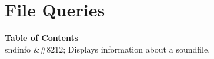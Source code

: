 \begin{comment}
\documentclass[10pt]{article}
\usepackage{fullpage, graphicx, url}
\setlength{\parskip}{1ex}
\setlength{\parindent}{0ex}
\title{File Queries}



\begin{tabular}{ccc}
The Alternative Csound Reference Manual & & \\
Previous &The Utility Programs &Next

\end{tabular}

\end{comment}
\section{File Queries}
\begin{description}
\item[\textbf{Table of Contents}
]\item[sndinfo \&\#8212; Displays information about a soundfile. ]
\end{description}


\begin{comment}
\begin{tabular}{lcr}
Previous &Home &Next \\
cvanal &Up &sndinfo

\end{tabular}



\end{comment}
